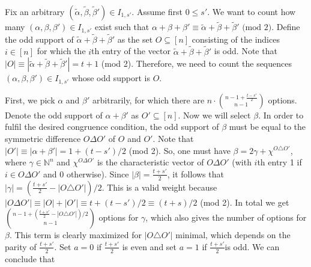 \documentclass[11pt]{article}
\makeatletter
\newcommand{\N}{\ensuremath{\mathbb{N}}}   %
\theoremstyle{plain}
\renewenvironment{proof}[1][\proofname]{%
  \par
  \pushQED{}%
  \normalfont
  \topsep6\p@\@plus6\p@
  \trivlist
  \item[\hskip\labelsep\itshape #1\@addpunct{.}]%
}{%
  \popQED
  \endtrivlist
}
\makeatother
\begin{document}
\begin{proof}
Fix an arbitrary $(\tilde\alpha,\tilde\beta,\tilde\beta')\in I_{1,s'}$. Assume first $0\leq s'$. We want to count how many $(\alpha,\beta,\beta')\in I_{1,s'}$ exist such that $\alpha+\beta+\beta'\equiv\tilde\alpha+\tilde\beta+\tilde\beta'\text{ (mod 2)}$. Define the odd support  of $\tilde\alpha+\tilde\beta+\tilde\beta'$ as the set $O\subseteq[n]$   consisting of the indices $i\in [n]$ for which the $i$th entry of the vector $\tilde\alpha+\tilde\beta+\tilde\beta'$ is odd. Note that $|O|\equiv |\tilde\alpha+\tilde\beta+\tilde\beta'|=t+1$ (mod 2). Therefore, we need to count the sequences $(\alpha,\beta,\beta')\in I_{1,s'}$ whose odd support is $O$.

        First, we pick $\alpha$ and $\beta'$ arbitrarily, for which  there are   $n\cdot\binom{n-1+\frac{t-s'}{2}}{n-1}$ options. Denote the odd support of $\alpha+\beta'$ as $O'\subseteq[n]$. Now we will select $\beta$. In order to fulfil the desired congruence condition,  the odd support of $\beta$ must be equal to the symmetric difference $O\Delta O'$ of $O$ and $O'$. Note that $|O'|\equiv |\alpha+\beta'|=1+(t-s')/2$ (mod 2).
 So, one must have $\beta=  2\gamma+\chi^{O\triangle O'}$, where $\gamma\in\N^n$ and $\chi^{O\Delta O'}$ is the characteristic vector of $O\Delta O'$ (with $i$th entry 1 if $i\in O\Delta O'$ and 0 otherwise).  Since $|\beta|=\frac{t+s'}{2}$, it follows that %
    $|\gamma|=(\frac{t+s'}{2}-|O\triangle O'|)/2$. This is a valid weight because 
    $|O\Delta O'|\equiv |O|+|O'|\equiv t +(t-s')/2 \equiv (t+s)/2$ (mod 2).
    In total we get $\binom{n-1+(\frac{t+s'}{2}-|O\triangle O'|)/2}{n-1}$ options for $\gamma$, which also gives the number  of options for $\beta$. This term is clearly maximized for $|O\triangle O'|$ minimal, which depends on the parity of $\frac{t+s'}{2}$. Set $a=0$ if $\frac{t+s'}{2}$ is even and set $a=1$ if $\frac{t+s'}{2}$is odd. We can conclude  that
    \begin{align}\label{eq:NstUpperBound}

\end{align}
\end{proof}
\end{document}
